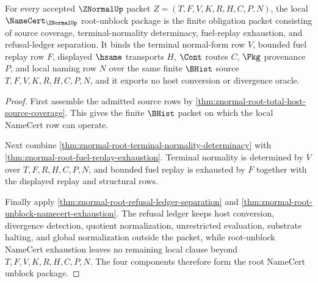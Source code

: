\begin{theorem}
\label{thm:znormal-root-namecert-unblock-package}
For every accepted $\ZNormalUp$ packet $Z=(T,F,V,K,R,H,C,P,N)$, the local $\NameCert_{\ZNormalUp}$ root-unblock package is the finite obligation packet consisting of source coverage, terminal-normality determinacy, fuel-replay exhaustion, and refusal-ledger separation. It binds the terminal normal-form row $V$, bounded fuel replay row $F$, displayed $\hsame$ transports $H$, $\Cont$ routes $C$, $\Pkg$ provenance $P$, and local naming row $N$ over the same finite $\BHist$ source $T,F,V,K,R,H,C,P,N$, and it exports no host conversion or divergence oracle.
\end{theorem}
\begin{proof}
First assemble the admitted source rows by \autoref{thm:znormal-root-total-host-source-coverage}. This gives the finite $\BHist$ packet on which the local NameCert row can operate.

Next combine \autoref{thm:znormal-root-terminal-normality-determinacy} with \autoref{thm:znormal-root-fuel-replay-exhaustion}. Terminal normality is determined by $V$ over $T,F,R,H,C,P,N$, and bounded fuel replay is exhausted by $F$ together with the displayed replay and structural rows.

Finally apply \autoref{thm:znormal-root-refusal-ledger-separation} and \autoref{thm:znormal-root-unblock-namecert-exhaustion}. The refusal ledger keeps host conversion, divergence detection, quotient normalization, unrestricted evaluation, substrate halting, and global normalization outside the packet, while root-unblock NameCert exhaustion leaves no remaining local clause beyond $T,F,V,K,R,H,C,P,N$. The four components therefore form the root NameCert unblock package.
\end{proof}
